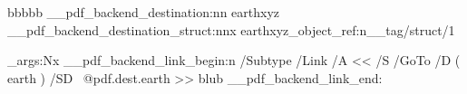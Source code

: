 \documentclass{article}
\begin{document}
bbbbb
\ExplSyntaxOn
\__pdf_backend_destination:nn          {earth}{xyz}
\__pdf_backend_destination_struct:nnx  {earth}{xyz}{\pdf_object_ref:n{__tag/struct/1}}

\exp_args:Nx
 \__pdf_backend_link_begin:n 
    { /Subtype /Link /A << /S /GoTo /D ( earth ) /SD~ @pdf.dest.earth >> }
 blub
 \__pdf_backend_link_end:
\ExplSyntaxOff
\end{document}
